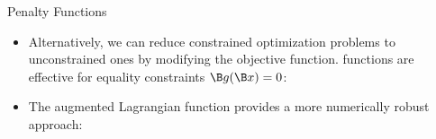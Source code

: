 %
%
%
%
%
%
%
%
%
%



\begin{frame}{Penalty Functions}

\begin{itemize}
\item Alternatively, we can reduce constrained optimization problems to unconstrained ones by modifying the objective function.  functions are effective for equality constraints $\B g(\B x)=0$:


\item The augmented Lagrangian function provides a more numerically robust approach:
\lgcond{
\[\mathcal{L}_\rho(\B x, \B \lambda) = f(\B x) + \B \lambda^T\B g(\B x) + \frac{1}{2} \rho \B g(\B x)^T \B g(\B x)\]
}
\end{itemize}

\end{frame}

